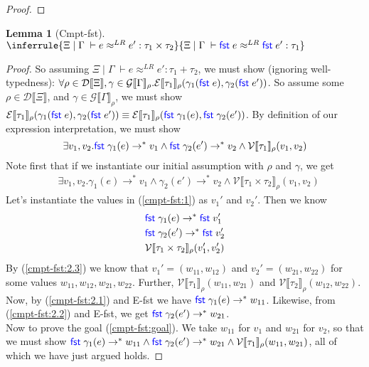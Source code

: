 \documentclass[twoside,11pt,openright]{report}
\newtheorem{lemma}[theorem]{Lemma}
\theoremstyle{definition}
\newcommand{\Keyword}[1]{{\color{blue} \mathsf{#1}}}
\newcommand{\expr}{e}
\newcommand{\val}{v}
\newcommand{\valB}{w}
\newcommand{\Fst}{\Keyword{fst}\;}
\newcommand{\Tprod}[2]{#1 \times #2}
\newcommand{\Tsum}[2]{#1 + #2}
\newcommand{\typ}{\tau}
\newcommand{\venv}{\Gamma}
\newcommand{\tenv}{\Xi}
\newcommand{\jdgRel}[6]{#1 \; | \; #2 \; \vdash #3 \approx^{#4} #5 : #6}
\newcommand{\stepS}{\rightarrow^*}
\newcommand{\ValInp}[2]{\mathcal{V} \llbracket #1 \rrbracket_{#2}}
\newcommand{\ExpInp}[2]{\mathcal{E} \llbracket #1 \rrbracket_{#2}}
\newcommand{\VenvInp}[2]{\mathcal{G} \llbracket #1 \rrbracket_{#2}}
\newcommand{\TenvInp}[1]{\mathcal{D} \llbracket #1 \rrbracket}
\newcommand{\LogRel}[5]{\jdgRel{#1}{#2}{#3}{LR}{#4}{#5}}
\begin{document}
\begin{proof}
\end{proof}

\begin{lemma}[Cmpt-fst]
  $\inferrule
  { \LogRel{\tenv}{\venv}{\expr}{\expr'}{\Tprod{\typ_1}{\typ_2}} }
  { \LogRel{\tenv}{\venv}{\Fst \expr}{\Fst \expr'}{\typ_1} }$
\end{lemma}
\begin{proof}
  So assuming $\LogRel{\tenv}{\venv}{\expr}{\expr'}{\Tsum{\typ_1}{\typ_2}}$, we must show (ignoring well-typedness): $\forall \rho \in \TenvInp{\tenv}, \gamma \in \VenvInp{\venv}{\rho} . \ExpInp{\typ_1}{\rho}(\gamma_1(\Fst \expr), \gamma_2(\Fst \expr'))$. So assume some $\rho \in \TenvInp{\tenv}$, and $\gamma \in \VenvInp{\venv}{\rho}$, we must show $\ExpInp{\typ_1}{\rho}(\gamma_1(\Fst \expr), \gamma_2(\Fst \expr')) \equiv \ExpInp{\typ_1}{\rho}(\Fst \gamma_1(\expr), \Fst \gamma_2(\expr'))$. By definition of our expression interpretation, we must show
  \begin{equation}\label{cmpt-fst:goal}
    \exists \val_1, \val_2 . \Fst \gamma_1(\expr) \stepS \val_1 \land \Fst \gamma_2(\expr') \stepS \val_2 \land \ValInp{\typ_1}{\rho}(\val_1, \val_2)
  \end{equation}
  Note first that if we instantiate our initial assumption with $\rho$ and $\gamma$, we get
  \begin{align}
    &\exists \val_1, \val_2 . \gamma_1(\expr) \stepS \val_1 \land \gamma_2(\expr') \stepS \val_2 \land \ValInp{\Tprod{\typ_1}{\typ_2}}{\rho}(\val_1, \val_2)\label{cmpt-fst:1}
  \end{align}
  Let's instantiate the values in (\ref*{cmpt-fst:1}) as $\val_1'$ and $\val_2'$. Then we know
  \begin{align}
    &\Fst \gamma_1(\expr) \stepS \Fst \val_1'\label{cmpt-fst:2.1}\\
    &\Fst \gamma_2(\expr') \stepS \Fst \val_2'\label{cmpt-fst:2.2}\\
    &\ValInp{\Tprod{\typ_1}{\typ_2}}{\rho}(\val_1', \val_2')\label{cmpt-fst:2.3}
  \end{align}
  By (\ref*{cmpt-fst:2.3}) we know that $\val_1' = (\valB_{11}, \valB_{12})$ and $\val_2' = (\valB_{21}, \valB_{22})$ for some values $\valB_{11}, \valB_{12}, \valB_{21}, \valB_{22}$. Further, $\ValInp{\typ_1}{\rho}(\valB_{11}, \valB_{21})$ and $\ValInp{\typ_2}{\rho}(\valB_{12}, \valB_{22})$. Now, by (\ref*{cmpt-fst:2.1}) and E-fst we have $\Fst \gamma_1(\expr) \stepS \valB_{11}$. Likewise, from (\ref*{cmpt-fst:2.2}) and E-fst, we get $\Fst \gamma_2(\expr') \stepS \valB_{21}$.\\
  Now to prove the goal (\ref*{cmpt-fst:goal}). We take $\valB_{11}$ for $\val_1$ and $\valB_{21}$ for $\val_2$, so that we must show $ \Fst \gamma_1(\expr) \stepS \valB_{11} \land \Fst \gamma_2(\expr') \stepS \valB_{21} \land \ValInp{\typ_1}{\rho}(\valB_{11}, \valB_{21})$, all of which we have just argued holds.
\end{proof}
\end{document}
